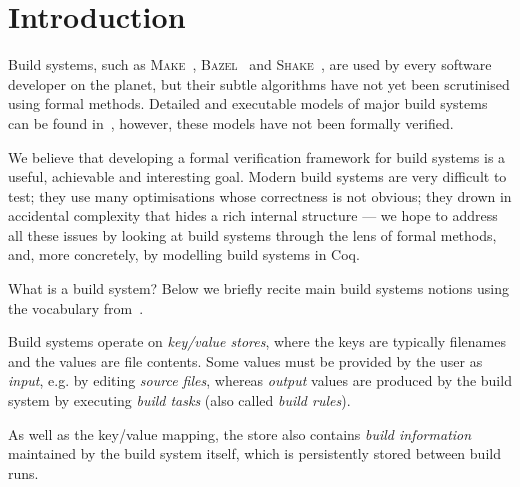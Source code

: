 \documentclass[sigplan,review]{acmart}\settopmatter{printfolios=true,printccs=false,printacmref=false}
\newcommand{\Bazel}{\textsc{Bazel}\xspace}
\newcommand{\Make}{\textsc{Make}\xspace}
\newcommand{\Shake}{\textsc{Shake}\xspace}
\begin{document}
\maketitle

\vspace{-3mm}
\section{Introduction}
\vspace{-1mm}

Build systems, such as \Make~\cite{feldman1979make},
\Bazel~\cite{bazel} and \Shake~\cite{mitchell2012shake}, are used by every
software developer on the planet, but their subtle algorithms have not yet been
scrutinised using formal methods. Detailed and executable models of major build
systems can be found in~\cite{Mokhov2018icfp}, however, these models have not
been formally verified.

We believe that developing a formal verification framework for build systems
is a useful, achievable and interesting goal. Modern build systems are
very difficult to test; they use many optimisations whose correctness is not
obvious; they drown in accidental complexity that hides a rich internal
structure --- we hope to address all these issues by looking at build systems
through the lens of formal methods, and, more concretely, by modelling build
systems in Coq.

What is a build system? Below we briefly recite main build systems notions
using the vocabulary from~\cite{Mokhov2018icfp}.

Build systems operate on \emph{key/value stores}, where the keys are typically
filenames and the values are file contents. Some values must be provided by
the user as \emph{input}, e.g. by editing \emph{source files}, whereas
\emph{output} values are produced by the build system by executing \emph{build
tasks} (also called \emph{build rules}).

As well as the key/value mapping, the store also contains \emph{build
information} maintained by the build system itself, which is persistently stored
between build runs.
\end{document}
